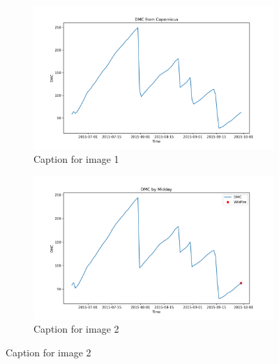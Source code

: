 \begin{figure}[h]
\caption{HELLo}
    \centering
    \begin{subfigure}{0.49\textwidth}
        \centering
        \includegraphics[width=\textwidth]{graphs/2015MesmoSitio/2015CopernicusDMC12.png}
        \caption{Caption for image 1}
        \label{fig:img1}
    \end{subfigure}
    \hfill
    \begin{subfigure}{0.49\textwidth}
        \centering
        \includegraphics[width=\textwidth]{graphs/2015MesmoSitio/2015CalcDMC12.png}
        \caption{Caption for image 2}
        \label{fig:img2}
    \end{subfigure}
    \label{fig:both_images}
\end{figure}

